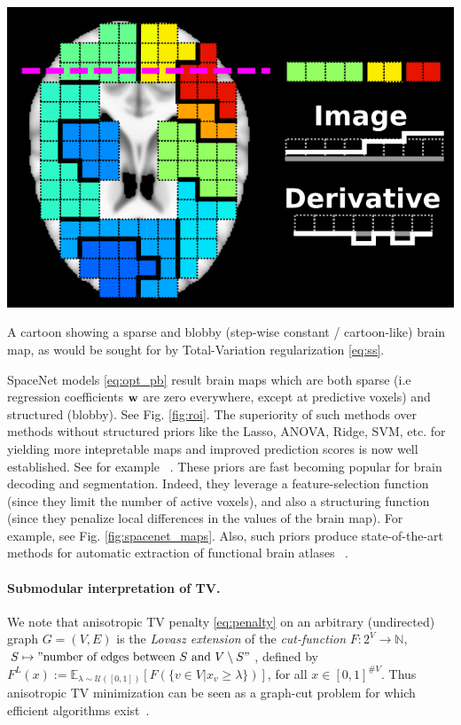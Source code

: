 \begin{marginfigure}
  \includegraphics[width=1\linewidth]{figures/tv_cartoon_horizontal.png}
  \caption{A cartoon showing a sparse and blobby (step-wise constant / cartoon-like) brain map,
  as would be sought for by Total-Variation regularization \eqref{eq:ss}.}
  \label{fig:roi}
\end{marginfigure}

SpaceNet models \eqref{eq:opt_pb} result brain maps which are both
sparse (i.e regression coefficients $\mathbf{w}$ are zero everywhere, except at
predictive voxels) and structured (blobby). See Fig. \ref{fig:roi}. The superiority of such
methods over methods without structured priors like the Lasso, ANOVA,
Ridge, SVM, etc. for yielding more intepretable maps and improved
prediction scores is now well established. See for example
 ~\citep{baldassarre2012,gramfort2013}. These priors are fast becoming
popular for brain decoding and segmentation. Indeed, they leverage a
feature-selection function
(since they limit the number of active voxels),
and also a structuring function
(since they penalize local
differences in the values of the brain map). For example, see Fig.
\ref{fig:spacenet_maps}.
Also, such priors produce state-of-the-art methods for automatic
extraction of functional brain atlases  ~\citep{abraham2013}.

\begin{shaded}
  \paragraph{Submodular interpretation of TV.} We note that anisotropic TV penalty \eqref{eq:penalty} on
  an arbitrary (undirected) graph $G = (V,E)$ is the \textit{Lovasz extension} of the \textit{cut-function}
  $F : 2^V \rightarrow \mathbb N$, $S \mapsto "\text{number of edges between } S \text{ and }V\setminus S"$,
defined by $F^L(x) := \mathbb E_{\lambda \sim \mathcal U([0,1])}[F(\{v \in V|x_v \ge \lambda\})]$, for all $x \in [0,1]^{\#V}$. Thus anisotropic TV minimization can be seen as a graph-cut problem for which efficient algorithms exist~\citep{bach13sub,landrieu16}.
\end{shaded}

